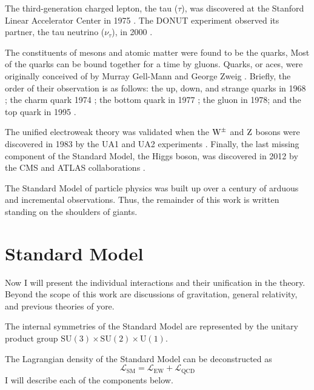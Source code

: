 The third-generation charged lepton, the tau ($\tau$), was discovered at the Stanford Linear Accelerator Center in 1975 \cite{Perl1975}.
The DONUT experiment observed its partner, the tau neutrino ($\nu_\tau$), in 2000 \cite{Donut2001}.

The constituents of mesons and atomic matter were found to be the quarks, 
Most of the quarks can be bound together for a time by gluons. 
Quarks, or aces, were originally conceived of by Murray Gell-Mann \cite{GellMann:1964nj} and George Zweig \cite{Zweig:570209}.
Briefly, the order of their observation is as follows: 
the up, down, and strange quarks in 1968 \cite{PhysRevLett.23.930} \cite{PhysRevLett.23.935};
the charm quark 1974 \cite{Ting1974} \cite{Richter1974};
the bottom quark in 1977 \cite{Lederman1977};
the gluon in 1978; \cite{Stella2011}
and the top quark in 1995 \cite{CDFTop1995} \cite{D0Top1995}.

The unified electroweak theory was validated when the $\mathrm{W}^\pm$ and $\mathrm{Z}$ bosons 
were discovered in 1983 by the UA1 and UA2 experiments 
\cite{Arnison:1983mk} \cite{Arnison:1983rp} \cite{Bagnaia:1983zx} \cite{Banner:1983jy}. 
Finally, the last missing component of the Standard Model, the Higgs boson, was discovered in 2012 by the CMS and ATLAS collaborations \cite{Chatrchyan:2012xdj} \cite{Aad:2012tfa}.

The Standard Model of particle physics was built up over a century of arduous and incremental observations. Thus, the remainder of this work is written standing on the shoulders of giants.

\section{Standard Model}
Now I will present the individual interactions and their unification in the theory.
Beyond the scope of this work are discussions of gravitation, general relativity, and
previous theories of yore.

The internal symmetries of the Standard Model are represented by the unitary product group 
$\mathrm{SU}(3) \times \mathrm{SU}(2) \times \mathrm{U}(1)$.

The Lagrangian density of the Standard Model can be deconstructed as
\begin{equation}
\mathcal{L}_\mathrm{SM} = \mathcal{L}_\mathrm{EW} + \mathcal{L}_\mathrm{QCD}
\end{equation}
I will describe each of the components below.

